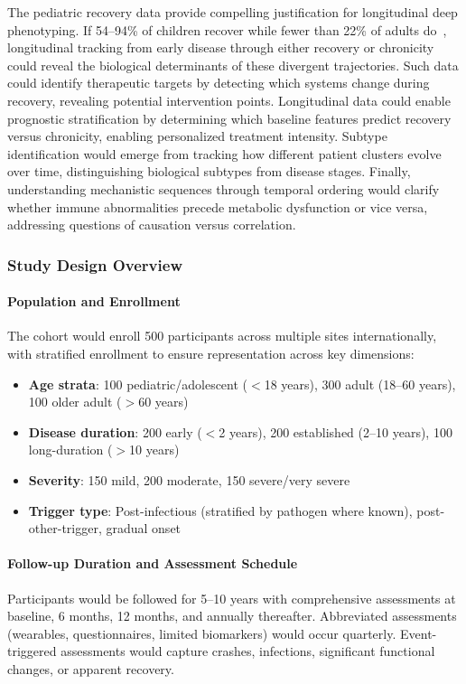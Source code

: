 The pediatric recovery data provide compelling justification for longitudinal deep phenotyping. If 54--94\% of children recover while fewer than 22\% of adults do~\cite{Joyce1997prognosis, Rowe2019pediatric}, longitudinal tracking from early disease through either recovery or chronicity could reveal the biological determinants of these divergent trajectories. Such data could identify therapeutic targets by detecting which systems change during recovery, revealing potential intervention points. Longitudinal data could enable prognostic stratification by determining which baseline features predict recovery versus chronicity, enabling personalized treatment intensity. Subtype identification would emerge from tracking how different patient clusters evolve over time, distinguishing biological subtypes from disease stages. Finally, understanding mechanistic sequences through temporal ordering would clarify whether immune abnormalities precede metabolic dysfunction or vice versa, addressing questions of causation versus correlation.

\subsubsection{Study Design Overview}

\paragraph{Population and Enrollment}
The cohort would enroll 500 participants across multiple sites internationally, with stratified enrollment to ensure representation across key dimensions:
\begin{itemize}
    \item \textbf{Age strata}: 100 pediatric/adolescent ($<$18 years), 300 adult (18--60 years), 100 older adult ($>$60 years)
    \item \textbf{Disease duration}: 200 early ($<$2 years), 200 established (2--10 years), 100 long-duration ($>$10 years)
    \item \textbf{Severity}: 150 mild, 200 moderate, 150 severe/very severe
    \item \textbf{Trigger type}: Post-infectious (stratified by pathogen where known), post-other-trigger, gradual onset
\end{itemize}

\paragraph{Follow-up Duration and Assessment Schedule}
Participants would be followed for 5--10 years with comprehensive assessments at baseline, 6 months, 12 months, and annually thereafter. Abbreviated assessments (wearables, questionnaires, limited biomarkers) would occur quarterly. Event-triggered assessments would capture crashes, infections, significant functional changes, or apparent recovery.

